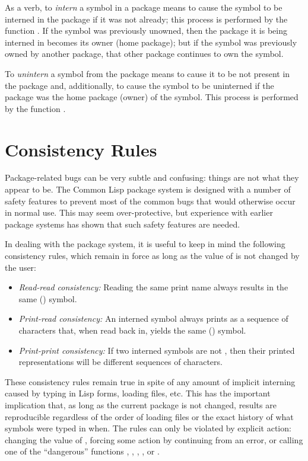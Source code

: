 As a verb, to \emph{intern} a symbol in a package means to cause the
symbol to be interned in the package if it was not already;
this process is performed by the function .
If the symbol was previously unowned, then the package it is being
interned in becomes its owner (home package); but
if the symbol was previously owned by another package, that other package
continues to own the symbol.

To \emph{unintern} a symbol from the package means to cause it to be not
present in the package
and, additionally, to cause the symbol to be uninterned if the
package was the home package (owner) of the symbol.
This process is performed by the function .

\section{Consistency Rules}

Package-related bugs can be very subtle and confusing: things are not
what they appear to be.  The Common Lisp package system is designed with
a number of safety features to prevent most of the common bugs that
would otherwise occur in normal use.  This may seem over-protective, but
experience with earlier package systems has shown that such safety
features are needed.

In dealing with the package system, it is useful to keep in mind the
following consistency rules, which remain in force as long as the value
of  is not changed by the user:

\begin{itemize}
\item
\emph{Read-read consistency:} Reading the same print name always results in
the same () symbol.

\item
\emph{Print-read consistency:} An interned symbol always prints as a
sequence of characters that, when read back in, yields the same ()
symbol.

\item
\emph{Print-print consistency:} If two interned symbols are not , then
their printed representations will be different sequences of
characters.
\end{itemize}

These consistency rules remain true in spite of any amount of implicit
interning caused by typing in Lisp forms, loading files, etc.  This has
the important implication that, as long as the current package
is not changed, results are reproducible regardless of
the order of loading files or the exact history of what symbols were
typed in when.  The rules can only be violated by explicit action:
changing the value of , forcing some action by continuing
from an error, or calling one of the ``dangerous'' functions
, , ,
, or .

